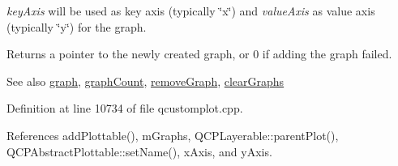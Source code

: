 {\itshape key\+Axis} will be used as key axis (typically \char`\"{}x\char`\"{}) and {\itshape value\+Axis} as value axis (typically \char`\"{}y\char`\"{}) for the graph.

Returns a pointer to the newly created graph, or 0 if adding the graph failed.

\begin{DoxySeeAlso}{See also}
\hyperlink{class_q_custom_plot_a6d3ed93c2bf46ab7fa670d66be4cddaf}{graph}, \hyperlink{class_q_custom_plot_a7d9b4d19114b2fde60f0233eeb0aa682}{graph\+Count}, \hyperlink{class_q_custom_plot_a903561be895fb6528a770d66ac5e6713}{remove\+Graph}, \hyperlink{class_q_custom_plot_ab0f3abff2d2f7df3668b5836f39207fa}{clear\+Graphs} 
\end{DoxySeeAlso}


Definition at line 10734 of file qcustomplot.\+cpp.



References add\+Plottable(), m\+Graphs, Q\+C\+P\+Layerable\+::parent\+Plot(), Q\+C\+P\+Abstract\+Plottable\+::set\+Name(), x\+Axis, and y\+Axis.


